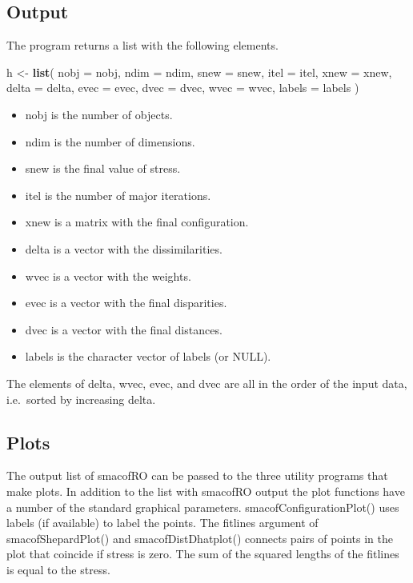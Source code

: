 \documentclass[
  12pt,
]{article}
\newenvironment{Shaded}{\begin{snugshade}}{\end{snugshade}}
\newcommand{\AttributeTok}[1]{\textcolor[rgb]{0.13,0.29,0.53}{#1}}
\newcommand{\FunctionTok}[1]{\textcolor[rgb]{0.13,0.29,0.53}{\textbf{#1}}}
\newcommand{\NormalTok}[1]{#1}
\newcommand{\OtherTok}[1]{\textcolor[rgb]{0.56,0.35,0.01}{#1}}
\providecommand{\tightlist}{%
  \setlength{\itemsep}{0pt}\setlength{\parskip}{0pt}}
\begin{document}
\subsection{Output}\label{output}

The program returns a list with the following elements.

\begin{Shaded}
\begin{Highlighting}[]
\NormalTok{  h }\OtherTok{\textless{}{-}} \FunctionTok{list}\NormalTok{(}
    \AttributeTok{nobj =}\NormalTok{ nobj,}
    \AttributeTok{ndim =}\NormalTok{ ndim,}
    \AttributeTok{snew =}\NormalTok{ snew,}
    \AttributeTok{itel =}\NormalTok{ itel,}
    \AttributeTok{xnew =}\NormalTok{ xnew,}
    \AttributeTok{delta =}\NormalTok{ delta,}
    \AttributeTok{evec =}\NormalTok{ evec,}
    \AttributeTok{dvec =}\NormalTok{ dvec,}
    \AttributeTok{wvec =}\NormalTok{ wvec,}
    \AttributeTok{labels =}\NormalTok{ labels}
\NormalTok{  )}
\end{Highlighting}
\end{Shaded}

\begin{itemize}
\tightlist
\item
  nobj is the number of objects.
\item
  ndim is the number of dimensions.
\item
  snew is the final value of stress.
\item
  itel is the number of major iterations.
\item
  xnew is a matrix with the final configuration.
\item
  delta is a vector with the dissimilarities.
\item
  wvec is a vector with the weights.
\item
  evec is a vector with the final disparities.
\item
  dvec is a vector with the final distances.
\item
  labels is the character vector of labels (or NULL).
\end{itemize}

The elements of delta, wvec, evec, and dvec are all in the order of the
input data, i.e.~sorted by increasing delta.

\subsection{Plots}\label{plots}

The output list of smacofRO can be passed to the three utility programs that make plots.
In addition to the list with smacofRO output the plot functions have a number of the
standard graphical parameters. smacofConfigurationPlot() uses labels (if available) to label the
points. The fitlines argument of smacofShepardPlot() and smacofDistDhatplot()
connects pairs of points in the plot that coincide if stress is zero. The sum of the squared lengths
of the fitlines is equal to the stress.
\end{document}

